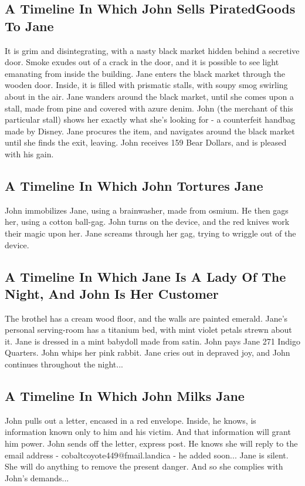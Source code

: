 \documentclass{article}
\begin{document}
\subsection{A Timeline In Which John Sells PiratedGoods To Jane}


It is grim and disintegrating, with a nasty black market hidden behind a secretive door.
Smoke exudes out of a crack in the door, and it is possible to see light emanating from inside the building.
Jane enters the black market through the wooden door.
Inside, it is filled with prismatic stalls, with soupy smog swirling about in the air.
Jane wanders around the black market, until she comes upon a stall, made from pine and covered with azure denim.
John (the merchant of this particular stall) shows her exactly what she's looking for {-} a counterfeit handbag made by Disney.
Jane procures the item, and navigates around the black market until she finds the exit, leaving.
John receives 159 Bear Dollars, and is pleased with his gain.
\subsection{A Timeline In Which John Tortures Jane}


John immobilizes Jane, using a brainwasher, made from osmium.
He then gags her, using a cotton ball{-}gag.
John turns on the device, and the red knives work their magic upon her.
Jane screams through her gag, trying to wriggle out of the device.
\subsection{A Timeline In Which Jane Is A Lady Of The Night, And John Is Her Customer}


The brothel has a cream wood floor, and the walls are painted emerald.
Jane's personal serving{-}room has a titanium bed, with mint violet petals strewn about it.
Jane is dressed in a mint babydoll made from satin.
John pays Jane 271 Indigo Quarters.
John whips her pink rabbit.
Jane cries out in depraved joy, and John continues throughout the night...
\subsection{A Timeline In Which John Milks Jane}


John pulls out a letter, encased in a red envelope. Inside, he knows, is information known only to him and his victim. And that information will grant him power.
John sends off the letter, express post. He knows she will reply to the email address {-} cobaltcoyote449@fmail.landica {-} he added soon...
Jane is silent. She will do anything to remove the present danger. And so she complies with John's demands...
\end{document}
